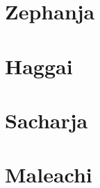 \chapter{Zephanja}
\begin{multicols}{2}
  \raggedcolumns
  \parskip=0pt \relax
  
\end{multicols}

\chapter{Haggai}
\begin{multicols}{2}
  \raggedcolumns
  \parskip=0pt \relax
  
\end{multicols}

\chapter{Sacharja}
\begin{multicols}{2}
  \raggedcolumns
  \parskip=0pt \relax
  
\end{multicols}

\chapter{Maleachi}
\begin{multicols}{2}
  \raggedcolumns
  \parskip=0pt \relax
  
\end{multicols}

\newpage

\pagestyle{empty}

